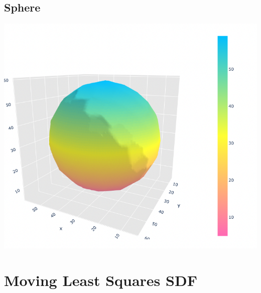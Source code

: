 \documentclass{article}
\begin{document}
\subsection*{Sphere}
\includegraphics[scale=0.4]{images/sphere_naive}

\section*{Moving Least Squares SDF}
\end{document}
